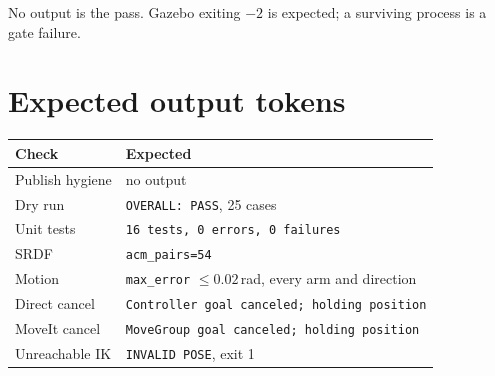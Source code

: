 No output is the pass. Gazebo exiting $-2$ is expected; a surviving process is a
gate failure.

\section{Expected output tokens}

\begin{table}[h]
\centering
\small
\begin{tabularx}{\linewidth}{@{}lX@{}}
\toprule
\textbf{Check} & \textbf{Expected} \\
\midrule
Publish hygiene & no output \\
Dry run & \texttt{OVERALL: PASS}, 25 cases \\
Unit tests & \texttt{16 tests, 0 errors, 0 failures} \\
SRDF & \texttt{acm\_pairs=54} \\
Motion & \texttt{max\_error} $\le 0.02$\,rad, every arm and direction \\
Direct cancel & \texttt{Controller goal canceled; holding position} \\
MoveIt cancel & \texttt{MoveGroup goal canceled; holding position} \\
Unreachable IK & \texttt{INVALID POSE}, exit 1 \\
\bottomrule
\end{tabularx}
\end{table}
